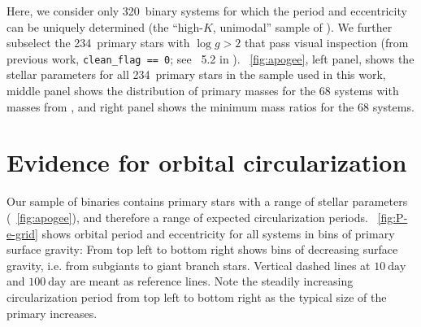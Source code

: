 \documentclass[modern, letterpaper]{aastex62}
\newcommand{\logg}{\ensuremath{\log g}}
\newcommand{\nunimodal}{320}
\newcommand{\nclean}{234}
\begin{document}
Here, we consider only \nunimodal\ binary systems for which the period and
eccentricity can be uniquely determined (the ``high-$K$, unimodal'' sample of
\citealt{Price-Whelan:2018}).
We further subselect the \nclean\ primary stars with $\logg > 2$ that pass
visual inspection (from previous work, \texttt{clean\_flag == 0}; see
\sectionname~5.2 in \citealt{Price-Whelan:2018}).
\figurename~\ref{fig:apogee}, left panel, shows the stellar parameters for all
\nclean\ primary stars in the sample used in this work, middle panel shows the
distribution of primary masses for the 68 systems with masses from
\cite{Ness:2015}, and right panel shows the minimum mass ratios for the 68
systems.


\section{Evidence for orbital circularization}
\label{sec:results}

Our sample of binaries contains primary stars with a range of stellar parameters
(\figurename~\ref{fig:apogee}), and therefore a range of expected
circularization periods.
\figurename~\ref{fig:P-e-grid} shows orbital period and eccentricity for all
systems in bins of primary surface gravity:
From top left to bottom right shows bins of decreasing surface gravity, i.e.
from subgiants to giant branch stars.
Vertical dashed lines at $10~\textrm{day}$ and $100~\textrm{day}$ are meant as
reference lines.
Note the steadily increasing circularization period from top left to bottom
right as the typical size of the primary increases.
\end{document}
